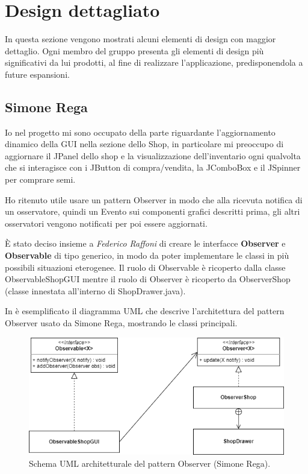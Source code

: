 \documentclass[a4paper,12pt]{report}
\begin{document}
\section{Design dettagliato}

In questa sezione vengono mostrati alcuni elementi di design con maggior dettaglio.
Ogni membro del gruppo presenta gli elementi di design più significativi da lui prodotti, al fine di realizzare l’applicazione, predisponendola a future espansioni.



\subsection{Simone Rega}
Io nel progetto mi sono occupato della parte riguardante l’aggiornamento dinamico della GUI nella sezione dello Shop, in particolare mi preoccupo di aggiornare il JPanel dello shop e la visualizzazione dell’inventario ogni qualvolta che si interagisce con i JButton di compra/vendita, la JComboBox e il JSpinner per comprare semi. 

Ho ritenuto utile usare un pattern Observer in modo che alla ricevuta notifica di un osservatore, quindi un Evento sui componenti grafici descritti prima, gli altri osservatori vengono notificati per poi essere aggiornati.

\hfill\break
È stato deciso insieme a\textit{ Federico Raffoni} di creare le interfacce \textbf{Observer} e \textbf{Observable} di tipo generico, in modo da poter implementare le classi in più possibili situazioni eterogenee.
Il ruolo di Observable è ricoperto dalla classe ObservableShopGUI mentre il ruolo di Observer è ricoperto da ObserverShop (classe innestata all’interno di ShopDrawer.java). 

\hfill\break
In  è esemplificato il diagramma UML che descrive l'architettura del pattern Observer usato da Simone Rega, mostrando le classi principali.
\hfill\break

\begin{figure}[!htb]
	\centerline{\includegraphics[scale=0.8]{img/UML_ObserverSimo.png}}
	
	\caption{Schema UML architetturale del pattern Observer (Simone Rega).}
	\label{img:SimoneRega_Observer}
\end{figure}
\end{document}
